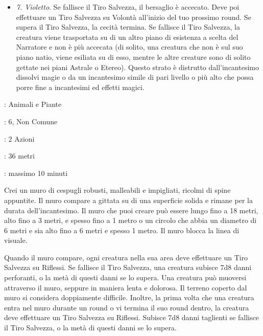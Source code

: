 \begin{multicols}{2}
\begin{itemize}[leftmargin=*]
	\item \emph{7. Violetto}. Se fallisce il Tiro Salvezza, il bersaglio è accecato. Deve poi effettuare un Tiro Salvezza su Volontà all'inizio del tuo prossimo round. Se supera il Tiro Salvezza, la cecità termina. Se fallisce il Tiro Salvezza, la creatura viene trasportata su di un altro piano di esistenza a scelta del Narratore e non è più accecata (di solito, una creatura che non è sul suo piano natio, viene esiliata su di esso, mentre le altre creature sono di solito gettate nei piani Astrale o Etereo). Questo strato è distrutto dall'incantesimo dissolvi magie o da un incantesimo simile di pari livello o più alto che possa porre fine a incantesimi ed effetti magici.

\end{itemize}

\noindent\colorbox{OBSSgold!10}{
\begin{minipage}{0.95\linewidth}
\begin{description}[noitemsep, topsep=0pt, parsep=0pt, partopsep=0pt, leftmargin=0cm, labelwidth=1.3cm]
	\item[\textbf{Lista}]: Animali e Piante
	\item[\textbf{Livello}]: 6, Non Comune
	\item[\textbf{Lancio}]: 2 Azioni
	\item[\textbf{Gittata}]: 36 metri
	\item[\textbf{Durata}]: massimo 10 minuti
\end{description}
\end{minipage}}\smallskip

Crei un muro di cespugli robusti, malleabili e impigliati, ricolmi di spine appuntite. Il muro compare a gittata su di una superficie solida e rimane per la durata dell'incantesimo. Il muro che puoi creare può essere lungo fino a 18 metri, alto fino a 3 metri, e spesso fino a 1 metro o un circolo che abbia un diametro di 6 metri e sia alto fino a 6 metri e spesso 1 metro. Il muro blocca la linea di visuale.

Quando il muro compare, ogni creatura nella sua area deve effettuare un Tiro Salvezza su Riflessi. Se fallisce il Tiro Salvezza, una creatura subisce 7d8 danni perforanti, o la metà di questi danni se lo supera. Una creatura può muoversi attraverso il muro, seppure in maniera lenta e dolorosa. Il terreno coperto dal muro si considera doppiamente difficile. Inoltre, la prima volta che una creatura entra nel muro durante un round o vi termina il suo round dentro, la creatura deve effettuare un Tiro Salvezza su Riflessi. Subisce 7d8 danni taglienti se fallisce il Tiro Salvezza, o la metà di questi danni se lo supera.


\end{multicols}
